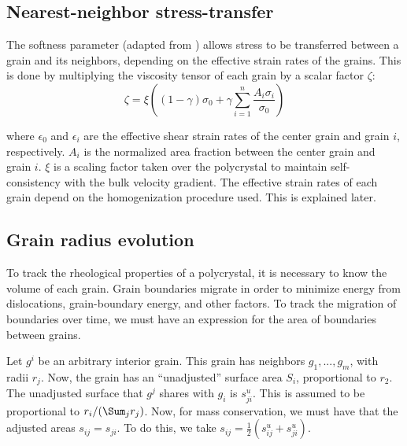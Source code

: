 \documentclass{igs}
\begin{document}
\subsection{Nearest-neighbor stress-transfer}
The softness parameter (adapted from \citet{throstur2002nni}) allows stress to be transferred between a grain and its neighbors, depending on the effective strain rates of the grains. This is done by multiplying the viscosity tensor of each grain by a scalar factor $\zeta$:
\begin{equation}
\zeta = \xi \left( \left( 1 - \gamma \right)  \sigma_0 + \gamma \sum_{i=1}^n \frac{A_i \sigma_i}{\sigma_0} \right)
\end{equation}

where $\epsilon_0$ and $\epsilon_i$ are the effective shear strain rates of the center grain and grain $i$, respectively. $A_i$ is the normalized area fraction between the center grain and grain $i$. $\xi$ is a scaling factor taken over the polycrystal to maintain self-consistency with the bulk velocity gradient. The effective strain rates of each grain depend on the homogenization procedure used. This is explained later.

\subsection{Grain radius evolution}
To track the rheological properties of a polycrystal, it is necessary to know the volume of each grain. Grain boundaries migrate in order to minimize energy from dislocations, grain-boundary energy, and other factors. To track the migration of boundaries over time, we must have an expression for the area of boundaries between grains.

Let $g^{i}$ be an arbitrary interior grain. This grain has neighbors $g_1,...,g_m$, with radii $r_j$. Now, the grain has an ``unadjusted'' surface area $S_i$, proportional to $r_2$. The unadjusted surface that $g^{j}$ shares with $g_i$ is $s^u_{ji}$. This is assumed to be proportional to $r_i / (\Sum_j r_j)$. Now, for mass conservation, we must have that the adjusted areas $s_{ij} = s_{ji}$. To do this, we take $s_{ij} = \frac{1}{2} ( s^u_{ij} + s^u_{ji})$.

\end{document}
